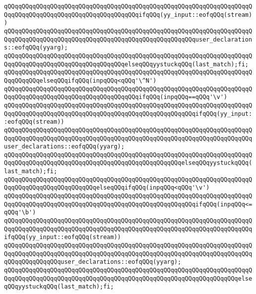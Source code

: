 \verb|qQQqqQQqqQQqqQQqqQQqqQQqqQQqqQQqqQQqqQQqqQQqqQQqqQQqqQQqqQQqqQQqqQQqqQQqqQQqqQQqqQQqqQQqqQQqqQQqqQQqqQQqqQQqifqQQq(yy_input::eofqQQq(stream))|\newline
\verb|qQQqqQQqqQQqqQQqqQQqqQQqqQQqqQQqqQQqqQQqqQQqqQQqqQQqqQQqqQQqqQQqqQQqqQQqqQQqqQQqqQQqqQQqqQQqqQQqqQQqqQQqqQQqqQQqqQQqqQQqqQQquser_declarations::eofqQQq(yyarg);|\newline
\verb|qQQqqQQqqQQqqQQqqQQqqQQqqQQqqQQqqQQqqQQqqQQqqQQqqQQqqQQqqQQqqQQqqQQqqQQqqQQqqQQqqQQqqQQqqQQqqQQqqQQqqQQqelseqQQqyystuckqQQq(last_match);fi;|\newline
\verb|qQQqqQQqqQQqqQQqqQQqqQQqqQQqqQQqqQQqqQQqqQQqqQQqqQQqqQQqqQQqqQQqqQQqqQQqqQQqqQQqelseqQQqifqQQq(inpqQQq<qQQq'\^N')|\newline
\verb|qQQqqQQqqQQqqQQqqQQqqQQqqQQqqQQqqQQqqQQqqQQqqQQqqQQqqQQqqQQqqQQqqQQqqQQqqQQqqQQqqQQqqQQqqQQqqQQqqQQqqQQqqQQqifqQQq(inpqQQq==qQQq'\v')|\newline
\verb|qQQqqQQqqQQqqQQqqQQqqQQqqQQqqQQqqQQqqQQqqQQqqQQqqQQqqQQqqQQqqQQqqQQqqQQqqQQqqQQqqQQqqQQqqQQqqQQqqQQqqQQqqQQqqQQqqQQqqQQqqQQqifqQQq(yy_input::eofqQQq(stream))|\newline
\verb|qQQqqQQqqQQqqQQqqQQqqQQqqQQqqQQqqQQqqQQqqQQqqQQqqQQqqQQqqQQqqQQqqQQqqQQqqQQqqQQqqQQqqQQqqQQqqQQqqQQqqQQqqQQqqQQqqQQqqQQqqQQqqQQqqQQqqQQqqQQquser_declarations::eofqQQq(yyarg);|\newline
\verb|qQQqqQQqqQQqqQQqqQQqqQQqqQQqqQQqqQQqqQQqqQQqqQQqqQQqqQQqqQQqqQQqqQQqqQQqqQQqqQQqqQQqqQQqqQQqqQQqqQQqqQQqqQQqqQQqqQQqqQQqelseqQQqyystuckqQQq(last_match);fi;|\newline
\verb|qQQqqQQqqQQqqQQqqQQqqQQqqQQqqQQqqQQqqQQqqQQqqQQqqQQqqQQqqQQqqQQqqQQqqQQqqQQqqQQqqQQqqQQqqQQqqQQqelseqQQqifqQQq(inpqQQq<qQQq'\v')|\newline
\verb|qQQqqQQqqQQqqQQqqQQqqQQqqQQqqQQqqQQqqQQqqQQqqQQqqQQqqQQqqQQqqQQqqQQqqQQqqQQqqQQqqQQqqQQqqQQqqQQqqQQqqQQqqQQqqQQqqQQqqQQqqQQqifqQQq(inpqQQq<=qQQq'\b')|\newline
\verb|qQQqqQQqqQQqqQQqqQQqqQQqqQQqqQQqqQQqqQQqqQQqqQQqqQQqqQQqqQQqqQQqqQQqqQQqqQQqqQQqqQQqqQQqqQQqqQQqqQQqqQQqqQQqqQQqqQQqqQQqqQQqqQQqqQQqqQQqqQQqifqQQq(yy_input::eofqQQq(stream))|\newline
\verb|qQQqqQQqqQQqqQQqqQQqqQQqqQQqqQQqqQQqqQQqqQQqqQQqqQQqqQQqqQQqqQQqqQQqqQQqqQQqqQQqqQQqqQQqqQQqqQQqqQQqqQQqqQQqqQQqqQQqqQQqqQQqqQQqqQQqqQQqqQQqqQQqqQQqqQQqqQQquser_declarations::eofqQQq(yyarg);|\newline
\verb|qQQqqQQqqQQqqQQqqQQqqQQqqQQqqQQqqQQqqQQqqQQqqQQqqQQqqQQqqQQqqQQqqQQqqQQqqQQqqQQqqQQqqQQqqQQqqQQqqQQqqQQqqQQqqQQqqQQqqQQqqQQqqQQqqQQqqQQqelseqQQqyystuckqQQq(last_match);fi;|\newline
